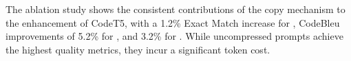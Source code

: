 The ablation study shows the consistent contributions of the copy mechanism to the enhancement of CodeT5, with a 1.2\% Exact Match increase for \taskone, CodeBleu improvements of 5.2\% for \tasktwo, and 3.2\% for \taskthree. While uncompressed prompts achieve the highest quality metrics, they incur a significant token cost.






